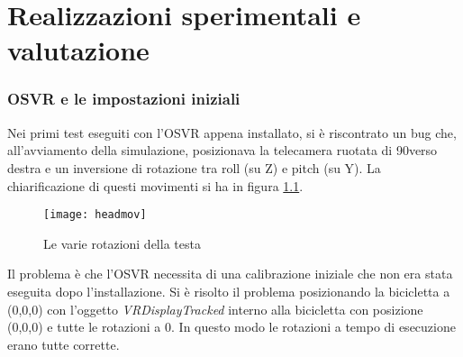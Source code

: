 \chapter{Realizzazioni sperimentali e valutazione}
\label{capitolo4}
\thispagestyle{empty}



\subsection{OSVR e le impostazioni iniziali}
\noindent Nei primi test eseguiti con l'OSVR appena installato, si è riscontrato un bug che, all'avviamento della simulazione, posizionava la telecamera ruotata di 90\degree verso destra e un inversione di rotazione tra roll (su Z) e pitch (su Y). La chiarificazione di questi movimenti si ha in figura \ref{fig:headmov}.
\begin{figure}[htb]
    \centering
    \texttt{[image: headmov]}
    \caption{Le varie rotazioni della testa\label{fig:headmov}}
    \vspace{-0.3cm}
\end{figure}
\newpage
\noindent Il problema è che l'OSVR necessita di una calibrazione iniziale che non era stata eseguita dopo l'installazione. Si è risolto il problema posizionando la bicicletta a (0,0,0) con l'oggetto \textit{VRDisplayTracked} interno alla bicicletta con posizione (0,0,0) e tutte le rotazioni a 0. In questo modo le rotazioni a tempo di esecuzione erano tutte corrette.